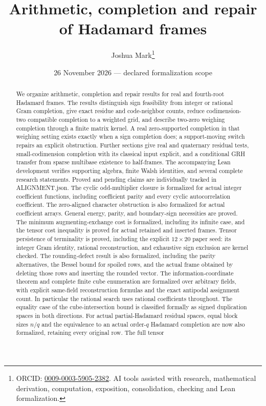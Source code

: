 \documentclass[11pt]{article}
\title{Arithmetic, completion and repair of Hadamard frames}
\author{Joshua Mark\thanks{ORCID: \href{https://orcid.org/0009-0003-5905-2382}{0009-0003-5905-2382}. AI tools assisted with research, mathematical derivation, computation, exposition, consolidation, checking and Lean formalization.}}
\date{26 November 2026 --- declared formalization scope}
\begin{document}
\maketitle
\begin{abstract}
We organize arithmetic, completion and repair results for real and fourth-root Hadamard
frames. The results distinguish sign feasibility from integer or rational
Gram completion, give exact residue and code-neighbor counts, reduce
codimension-two compatible completion to a weighted grid, and describe
two-zero weighing completion through a finite matrix kernel. A real
zero-supported completion in that weighing setting exists exactly when
a sign completion does; a support-moving switch repairs an explicit
obstruction. Further sections give real and quaternary residual tests,
small-codimension completion with its classical input explicit, and a
conditional GRH transfer from sparse multibase existence to half-frames.
The accompanying Lean development verifies supporting algebra, finite Walsh
identities, and several complete research statements. Proved and pending
claims are individually tracked in ALIGNMENT.json. The cyclic odd-multiplier
closure is formalized for actual integer coefficient functions, including
coefficient parity and every cyclic autocorrelation coefficient. The
zero-aligned character obstruction is also formalized for actual coefficient
arrays. General energy, parity, and boundary-sign necessities are proved. The
minimum augmenting-exchange cost is formalized, including its infinite case,
and the tensor cost inequality is proved for actual retained and inserted
frames. Tensor persistence of terminality is proved, including the explicit
$12\times20$ paper seed: its integer Gram identity, rational reconstruction,
and exhaustive sign exclusion are kernel checked. The rounding-defect result
is also formalized, including the parity alternatives, the Bessel
bound for spoiled rows, and the actual frame obtained by deleting those
rows and inserting the rounded vector. The information-coordinate
theorem and complete finite cube enumeration are formalized over arbitrary
fields, with explicit same-field reconstruction formulas and the exact
antipodal assignment count. In particular the rational search uses rational
coefficients throughout. The equality case of the cube-intersection bound
is classified formally as signed duplication spaces in both directions.
For actual partial-Hadamard residual spaces, equal block sizes $n/q$
and the equivalence to an actual order-$q$ Hadamard completion are now
also formalized, retaining every original row. The full tensor

\end{abstract}
\end{document}
